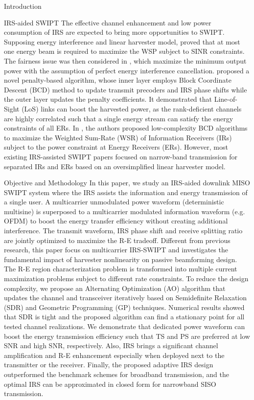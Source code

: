 \documentclass[journal]{IEEEtran}
\begin{document}
\begin{section}{Introduction}
		\begin{subsection}{IRS-aided SWIPT}
			The effective channel enhancement and low power consumption of IRS are expected to bring more opportunities to SWIPT. Supposing energy interference and linear harvester model, \cite{Wu2019b} proved that at most one energy beam is required to maximize the WSP subject to SINR constraints. The fairness issue was then considered in \cite{Tang2019}, which maximize the minimum output power with the assumption of perfect energy interference cancellation. \cite{Wu2019c} proposed a novel penalty-based algorithm, whose inner layer employs Block Coordinate Descent (BCD) method to update transmit precoders and IRS phase shifts while the outer layer updates the penalty coefficients. It demonstrated that Line-of-Sight (LoS) links can boost the harvested power, as the rank-deficient channels are highly correlated such that a single energy stream can satisfy the energy constraints of all ERs. In \cite{Pan2019a}, the authors proposed low-complexity BCD algorithms to maximize the Weighted Sum-Rate (WSR) of Information Receivers (IRs) subject to the power constraint at Energy Receivers (ERs). However, most existing IRS-assisted SWIPT papers focused on narrow-band transmission for separated IRs and ERs based on an oversimplified linear harvester model.
		\end{subsection}


		\begin{subsection}{Objective and Methodology}
			In this paper, we study an IRS-aided downlink MISO SWIPT system where the IRS assists the information and energy transmission of a single user. A multicarrier unmodulated power waveform (deterministic multisine) is superposed to a multicarrier modulated information waveform (e.g. OFDM) to boost the energy transfer efficiency without creating additional interference. The transmit waveform, IRS phase shift and receive splitting ratio are jointly optimized to maximize the R-E tradeoff. Different from previous research, this paper focus on multicarrier IRS-SWIPT and investigates the fundamental impact of harvester nonlinearity on passive beamforming design. The R-E region characterization problem is transformed into multiple current maximization problems subject to different rate constraints. To reduce the design complexity, we propose an Alternating Optimization (AO) algorithm that updates the channel and transceiver iteratively based on Semidefinite Relaxation (SDR) and Geometric Programming (GP) techniques. Numerical results showed that SDR is tight and the proposed algorithm can find a stationary point for all tested channel realizations. We demonstrate that dedicated power waveform can boost the energy transmission efficiency such that TS and PS are preferred at low SNR and high SNR, respectively. Also, IRS brings a significant channel amplification and R-E enhancement especially when deployed next to the transmitter or the receiver. Finally, the proposed adaptive IRS design outperformed the benchmark schemes for broadband transmission, and the optimal IRS can be approximated in closed form for narrowband SISO transmission.


\end{subsection}
\end{section}
\end{document}
